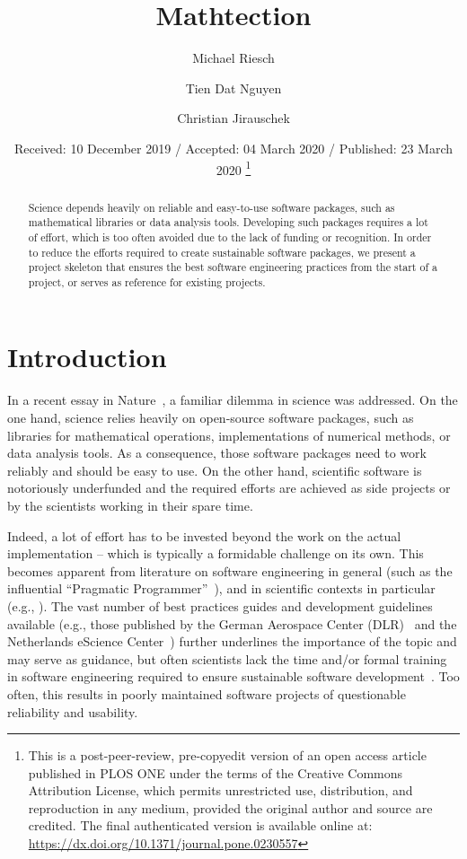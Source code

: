 \documentclass[@CLASSOPTIONS@]{tumarticle}
\title{Mathtection}
\author[affil={1,$\dagger$}, orcid=0000-0002-4030-2818,
  email={michael.riesch@tum.de}]{Michael Riesch}
\author[affil=1,orcid=0000-0003-2522-7335]{Tien Dat Nguyen}
\author[affil=1]{Christian Jirauschek}
\affil{Department of Electrical and Computer Engineering, Technical
  University of Munich, Arcisstr. 21, 80333 Munich, Germany}
\affil[mark=$\dagger$]{now with The \LaTeX{} Institute, TeXarkana, TeXas}
\date{Received: 10 December 2019 / Accepted: 04 March 2020 / Published:
  23 March 2020
  \thanks{This is a post-peer-review, pre-copyedit version of an open access
    article published in PLOS ONE under the terms of the Creative Commons
    Attribution License, which permits unrestricted use, distribution, and
    reproduction in any medium, provided the original author and source are
    credited. The final authenticated version is available online at:
    \url{https://dx.doi.org/10.1371/journal.pone.0230557}}}
\begin{document}
\maketitle

\begin{abstract}
  Science depends heavily on reliable and easy-to-use software packages, such
  as mathematical libraries or data analysis tools. Developing such packages
  requires a lot of effort, which is too often avoided due to the lack of
  funding or recognition. In order to reduce the efforts required to create
  sustainable software packages, we present a project skeleton that ensures
  the best software engineering practices from the start of a project, or
  serves as reference for existing projects.
\end{abstract}

\section{Introduction}

In a recent essay in Nature~\cite{nowogrodzki2019}, a familiar dilemma in
science was addressed. On the one hand, science relies heavily on
open-source software packages, such as libraries for mathematical operations,
implementations of numerical methods, or data analysis tools. As a
consequence, those software packages need to work reliably and should be
easy to use. On the other hand, scientific software is notoriously
underfunded and the required efforts are achieved as side projects or by the
scientists working in their spare time.

Indeed, a lot of effort has to be invested beyond the work on the actual
implementation -- which is typically a formidable challenge on its own. This
becomes apparent from literature on software engineering in general (such as
the influential ``Pragmatic Programmer''~\cite{hunt1999pragmatic}), and in
scientific contexts in particular (e.g.,
\cite{prlic2012, bangerth2013, wilson2014, wilson2017}). The vast number of
best practices guides and development guidelines available (e.g., those
published by the German Aerospace Center (DLR)~\cite{schlauch2018dlrguide}
and the Netherlands eScience Center~\cite{netherlands-guide2019}) further
underlines the importance of the topic and may serve as guidance, but often
scientists lack the time and/or formal training in software engineering
required to ensure sustainable software
development~\cite{nowogrodzki2019, wilson2014, wilson2017}. Too often, this
results in poorly maintained software projects of questionable reliability
and usability.
\end{document}

